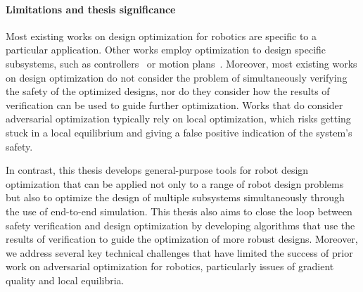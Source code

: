 \paragraph{Limitations and thesis significance}

Most existing works on design optimization for robotics are specific to a particular application. Other works employ optimization to design specific subsystems, such as controllers~\cite{xu_uav_controllers} or motion plans~\cite{schulmanMotionPlanningSequential2014}. Moreover, most existing works on design optimization do not consider the problem of simultaneously verifying the safety of the optimized designs, nor do they consider how the results of verification can be used to guide further optimization. Works that do consider adversarial optimization typically rely on local optimization, which risks getting stuck in a local equilibrium and giving a false positive indication of the system's safety.

In contrast, this thesis develops general-purpose tools for robot design optimization that can be applied not only to a range of robot design problems but also to optimize the design of multiple subsystems simultaneously through the use of end-to-end simulation. This thesis also aims to close the loop between safety verification and design optimization by developing algorithms that use the results of verification to guide the optimization of more robust designs. Moreover, we address several key technical challenges that have limited the success of prior work on adversarial optimization for robotics, particularly issues of gradient quality and local equilibria.